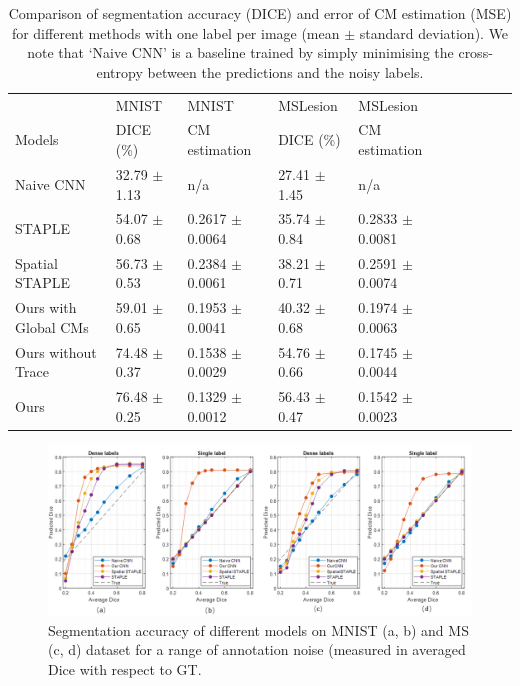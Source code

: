 \begin{table}[t!]
	\center
	\footnotesize
	\begin{tabular}{@{}llllllllll}
		\hline
		 & MNIST & MNIST  & MSLesion  & MSLesion  \\
		Models & DICE (\%) & CM estimation & DICE (\%) & CM estimation \\
		  
		\hline	
		Naive CNN & 32.79 $\pm$ 1.13 &  n/a & 27.41 $\pm$ 1.45 &  n/a  \\
		STAPLE \cite{warfield2004simultaneous}& 54.07 $\pm$ 0.68 &  0.2617 $\pm$ 0.0064& 35.74 $\pm$ 0.84 &  0.2833 $\pm$ 0.0081  \\ 
		Spatial STAPLE \cite{asman2012formulating} & 56.73 $\pm$ 0.53 &  0.2384 $\pm$ 0.0061& 38.21 $\pm$ 0.71 &  0.2591 $\pm$ 0.0074  \\
 		Ours with Global CMs  & 59.01 $\pm$ 0.65   & 0.1953 $\pm$ 0.0041   & 40.32 $\pm$ 0.68  & 0.1974 $\pm$ 0.0063    \\
		Ours without Trace & 74.48 $\pm$ 0.37  &  0.1538 $\pm$ 0.0029 & 54.76 $\pm$ 0.66 & 0.1745 $\pm$ 0.0044  \\
		Ours & 76.48 $\pm$ 0.25  &  0.1329 $\pm$ 0.0012 & 56.43 $\pm$ 0.47 &  0.1542 $\pm$ 0.0023  \\
		\hline
	\end{tabular}%
\caption{\small Comparison of segmentation accuracy (DICE) and error of CM estimation (MSE) for different methods with one label per image (mean $\pm$ standard deviation).  We note that `Naive CNN' is a baseline trained by simply minimising the cross-entropy between the predictions and the noisy labels. }
\label{singlelabel of MNIST and MS}
\vspace{-4mm}
\end{table}
\vspace{-4mm}

\begin{figure}[t!]
        \center
        \includegraphics[width=\linewidth]{chapter_8_neurips/picture3.png}
        \caption{Segmentation accuracy of different models on MNIST (a, b) and MS (c, d) dataset for a range of annotation noise (measured in averaged Dice with respect to GT.}
        \label{plot of denselabel and single label}
\end{figure}

